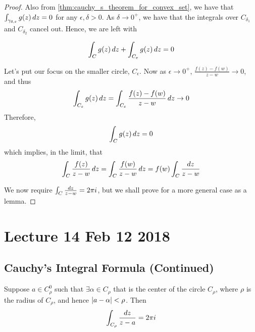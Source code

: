 \documentclass[notoc,notitlepage]{tufte-book}
\begin{document}
\begin{proof}
	Also from \cref{thm:cauchy_s_theorem_for_convex_set}, we have that $\int_{\gamma_{\delta, \varepsilon}} g(z) \mathop{}\!d{z} = 0$ for any $\epsilon, \delta > 0$. As $\delta \to 0^+$, we have that the integrals over $C_{\delta_1}$ and $C_{\delta_2}$ cancel out. Hence, we are left with

	\begin{equation*}
		\int_{C} g(z) \mathop{}\!d{z} + \int_{C_\varepsilon} g(z) \mathop{}\!d{z} = 0
	\end{equation*}

	Let's put our focus on the smaller circle, $C_\epsilon$. Now as $\epsilon \to 0^+$, $\frac{f(z) - f(w)}{z - w} \to 0$, and thus
	\begin{equation*}
		\int_{C_\varepsilon} g(z) \mathop{}\!d{z} = \int_{C_\varepsilon} \frac{f(z) - f(w)}{z - w} \mathop{}\!d{z} \to 0
	\end{equation*}
	Therefore,
	\begin{equation*}
		\int_{C} g(z) \mathop{}\!d{z} = 0
	\end{equation*}
	which implies, in the limit, that
	\begin{equation*}
		\int_{C} \frac{f(z)}{z - w} \mathop{}\!d{z}
			= \int_{C} \frac{f(w)}{z - w} \mathop{}\!d{z}
			= f(w) \int_{C} \frac{\mathop{}\!d{z}}{z - w}
	\end{equation*}
	
	We now require $\int_{C} \frac{\mathop{}\!d{z}}{z - w} = 2 \pi i$, but we shall prove for a more general case as a lemma.
\end{proof}



\chapter{Lecture 14 Feb 12 2018}
	\label{chapter:lecture_14_feb_12_2018}

\section{Cauchy's Integral Formula (Continued)} %
\label{sec:cauchy_s_integral_formula_continued}

\begin{lemma}\label{lemma:integral_equals_2_pi_i}

	Suppose $a \in C_\rho^0$ such that $\exists \alpha \in C_\rho$ that is the center of the circle $C_\rho$, where $\rho$ is the radius of $C_\rho$, and hence $\left|a - \alpha\right| < \rho$. Then
	\begin{equation*}
		\int_{C_\rho} \frac{\mathop{}\!d{z}}{z - a} = 2 \pi i
	\end{equation*}
\end{lemma}
\end{document}
